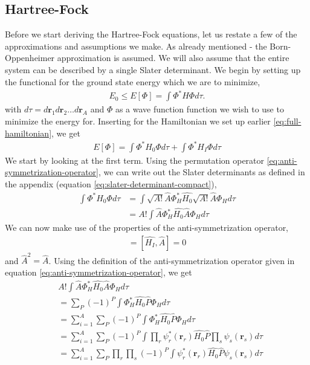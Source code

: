 \documentclass[11pt]{article}
\begin{document}
\subsection{Hartree-Fock}
Before we start deriving the Hartree-Fock equations, let us restate a few of the approximations and assumptions we make. As already mentioned - the Born-Oppenheimer approximation is assumed. We will also assume that the entire system can be described by a single Slater determinant. We begin by setting up the functional for the ground state energy which we are to minimize,
\begin{align}
	E_0 \leq E[\Phi] = \int \Phi^* \hat{H} \Phi d\tau.
	\label{eq:variational-principle}
\end{align}
with $d\tau = d\mathbf{r}_1d\mathbf{r}_2\dots d\mathbf{r}_A$ and $\Phi$ as a wave function function we wish to use to minimize the energy for. Inserting for the Hamiltonian we set up earlier \eqref{eq:full-hamiltonian}, we get
\begin{align*}
	E[\Phi] = \int \Phi^* H_0 \Phi d\tau + \int \Phi^* H_I \Phi d\tau
\end{align*}
We start by looking at the first term. Using the permutation operator \eqref{eq:anti-symmetrization-operator}, we can write out the Slater determinants as defined in the appendix (equation \eqref{eq:slater-determinant-compact}),
\begin{align*}
	\int \Phi^* H_0 \Phi d\tau &= \int \sqrt{A!}\hat{A}\Phi_H^* \hat{H_0} \sqrt{A!}\hat{A}\Phi_H d\tau \\
	&= A! \int \hat{A}\Phi_H^* \hat{H_0} \hat{A}\Phi_H d\tau
\end{align*}
We can now make use of the properties of the anti-symmetrization operator,
\begin{align}
	[\hat{H_0},\hat{A}] = [\hat{H_I},\hat{A}] = 0
\end{align}
and $\hat{A}^2 = \hat{A}$. Using the definition of the anti-symmetrization operator given in equation \eqref{eq:anti-symmetrization-operator}, we get
\begin{align*}
	&A! \int \hat{A}\Phi_H^* \hat{H_0} \hat{A}\Phi_H d\tau \\
	&= \sum_P (-1)^P \int \Phi_H^* \hat{H_0} \hat{P} \Phi_H d\tau \\
	&= \sum^A_{i=1} \sum_P (-1)^P \int \Phi_H^* \hat{H_0} \hat{P} \Phi_H d\tau \\
	&= \sum^A_{i=1} \sum_P (-1)^P \int \prod_r \psi^*_r(\mathbf{r}_r) \hat{H_0} \hat{P} \prod_s \psi_s(\mathbf{r}_s) d\tau \\
	&= \sum^A_{i=1} \sum_P \prod_r \prod_s (-1)^P \int \psi^*_r(\mathbf{r}_r) \hat{H_0} \hat{P} \psi_s(\mathbf{r}_s) d\tau
\end{align*}
\end{document}
